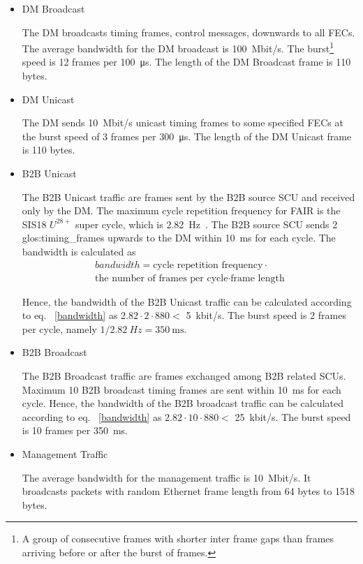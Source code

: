 \begin{itemize}
    \item DM Broadcast 

The DM broadcasts timing frames, control messages, downwards to all FECs. The average bandwidth for the DM broadcast is \SI{100}{Mbit/s}. The burst\footnote{A group of consecutive frames with shorter inter frame gaps than frames arriving before or after the burst of frames.} speed is 12 frames per \SI{100}{\micro\second}. The length of the DM Broadcast frame is 110 bytes.
 		\item DM Unicast 

The DM sends \SI{10}{Mbit/s} unicast timing frames to some specified FECs at the burst speed of 3 frames per \SI{300}{\micro\second}. The length of the DM Unicast frame is 110 bytes.
	\item B2B Unicast

The B2B Unicast traffic are frames sent by the B2B source SCU and received only by the DM. The maximum cycle repetition frequency for FAIR is the SIS18 $U^{28+}$ super cycle, which is \SI{2.82}{\Hz}~\cite{liebermann_sis100_2013}. The B2B source SCU sends 2 \gls{glos:timing_frame}s upwards to the DM within \SI{10}{\ms} for each cycle. The bandwidth is calculated as
\begin{equation}
\begin{split}
		bandwidth=\text{cycle repetition frequency}\cdot   \\ \text{the number of frames per cycle} \cdot \text{frame length}
\label{bandwidth}
\end{split}
\end{equation}

Hence, the bandwidth of the B2B Unicast traffic can be calculated according to eq. ~\ref{bandwidth} as $2.82\cdot2\cdot880<$ \SI{5}{kbit/s}. The burst speed is 2 frames per cycle, namely $1/\SI{2.82}{Hz}=\SI{350}{\ms}$.
	\item B2B Broadcast

The B2B Broadcast traffic are frames exchanged among B2B related SCUs. Maximum 10 B2B broadcast timing frames are sent within \SI{10}{\ms} for each cycle. Hence, the bandwidth of the B2B broadcast traffic can be calculated according to eq. ~\ref{bandwidth} as $2.82\cdot10\cdot880<$ \SI{25}{kbit/s}. The burst speed is 10 frames per \SI{350}{\ms}.

	\item Management Traffic

The average bandwidth for the management traffic is \SI{10}{Mbit/s}. It broadcasts packets with random Ethernet frame length from 64 bytes to 1518 bytes. 
\end{itemize}

